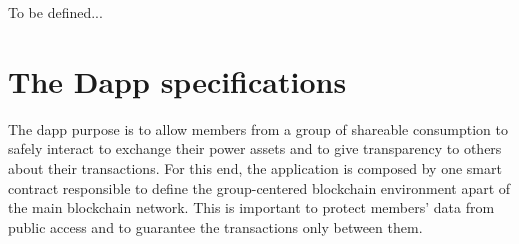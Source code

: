 
\begin{table}[h!tbp]{\textwidth}
    \centering
    \caption{To be defined...}
    \label{tab:comparison}
    \frame{}
\end{table}

\section{The Dapp specifications}
\label{sec:the-dapp}



The \gls{dapp} purpose is to allow members from a group of shareable consumption to safely interact to exchange their power assets and to give transparency to others about their transactions.
For this end, the application is composed by one smart contract responsible to define the group-centered blockchain environment apart of the main blockchain network.
This is important to protect members' data from public access and to guarantee the transactions only between them.

